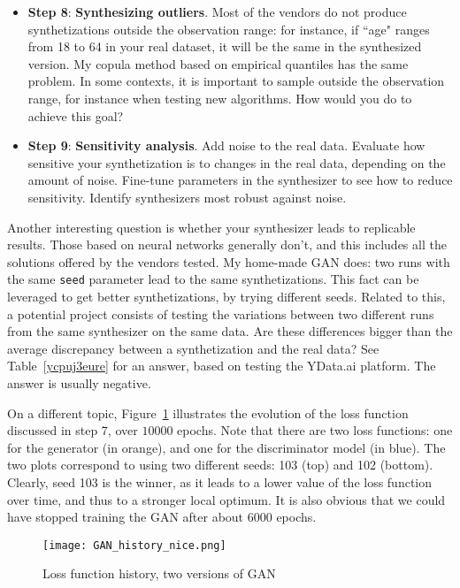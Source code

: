 \documentclass[oneside,10pt]{book}
\begin{document}
\begin{itemize}
\item[] {\bf Step 8}: {\bf Synthesizing outliers}. Most of the vendors do not produce synthetizations outside the observation range: for instance, if ``age" ranges from 18 to 64 in your real dataset, it will be the same in the synthesized version.  
 My copula method based on empirical quantiles has the same problem. In some contexts, it is important to sample outside the observation range,
 for instance when testing new algorithms. How would you do to achieve this goal?  \vspace{1ex}

\item[] {\bf Step 9}: {\bf Sensitivity analysis}. Add noise to the real data. Evaluate how sensitive your synthetization is to changes in the real data, depending on the amount of noise. Fine-tune parameters in the synthesizer to see how to reduce sensitivity. Identify synthesizers most robust against noise.
\end{itemize}\vspace{1ex}
 
\noindent Another interesting question is whether your synthesizer leads to replicable results. Those based on neural networks generally don't, and this includes all the solutions offered by the vendors tested. My home-made GAN does: two runs with the same \texttt{seed} parameter lead to the same synthetizations. This fact can be leveraged to get better synthetizations, by trying different \textcolor{index}{seeds}. Related to this, a potential project consists of testing the variations between two different runs from the same synthesizer on the same data. Are these differences bigger than the average discrepancy between a synthetization and the real data? See Table~\ref{ycpuj3eure} for an answer, based on testing the YData.ai platform. The answer is usually negative.

On a different topic, Figure~\ref{fig:gretcocol} illustrates the evolution of the loss function discussed in step 7, over $\num{10000}$ epochs.
 Note that there are two loss functions: one for the generator (in orange), and one for the discriminator model (in blue). The two plots correspond to using two different seeds: 103 (top) and 102 (bottom). Clearly, seed 103 is the winner, as it leads to a lower value of the loss function over time, and thus to a stronger local optimum. It is also obvious that we could have stopped training the GAN after about $6000$ epochs.


\begin{figure}[H]
\centering
\texttt{[image: GAN\_history\_nice.png]}   
\caption{Loss function history, two versions of GAN}
\label{fig:gretcocol}
\end{figure}
\end{document}
